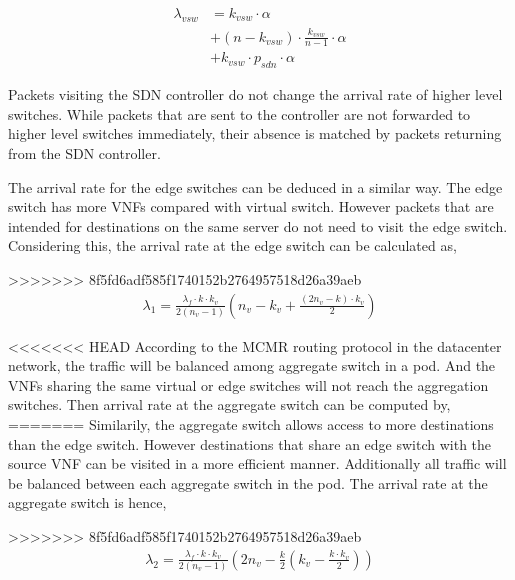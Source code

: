 \begin{equation}
\label{eq:arr_srv}
\begin{split}
\lambda_{vsw} &= k_{vsw} \cdot \alpha \\
			  &+ (n - k_{vsw}) \cdot \frac{k_{vsw}}{n - 1} \cdot \alpha \\
			  &+ k_{vsw} \cdot p_{sdn} \cdot \alpha
\end{split}
\end{equation}

Packets visiting the SDN controller do not change the arrival rate of higher level switches. While packets that are sent to the controller are not forwarded to higher level switches immediately, their absence is matched by packets returning from the SDN controller.

The arrival rate for the edge switches can be deduced in a similar way. The edge switch has more VNFs compared with virtual switch. However packets that are intended for destinations on the same server do not need to visit the edge switch. Considering this, the arrival rate at the edge switch can be calculated as,

>>>>>>> 8f5fd6adf585f1740152b2764957518d26a39aeb
\begin{equation}
\label{eq:arr_edge}
\begin{split}
\lambda _{1}=\frac { { \lambda  }_{ f }\cdot k\cdot k_{ v } }{ 2(n_v-1) } (n_v-k_{ v }+\frac { (2n_v-k)\cdot k_{ v } }{ 2 } )
\end{split}
\end{equation}

<<<<<<< HEAD
According to the MCMR routing protocol in the datacenter network, the traffic will be balanced among aggregate switch in a pod. And the VNFs sharing the same virtual or edge switches will not reach the aggregation switches. Then arrival rate at the aggregate switch can be computed by,
=======
Similarily, the aggregate switch allows access to more destinations than the edge switch. However destinations that share an edge switch with the source VNF can be visited in a more efficient manner. Additionally all traffic will be balanced between each aggregate switch in the pod. The arrival rate at the aggregate switch is hence,

>>>>>>> 8f5fd6adf585f1740152b2764957518d26a39aeb
\begin{equation}
\label{eq:arr_agg}
\begin{split}
\lambda _{ 2 }=\frac { { \lambda  }_{ f }\cdot k\cdot k_{ v } }{ 2({ n }_{ v }-1) } \left( 2{ n }_{ v }-\frac { k }{ 2 } \left( k_{ v }-\frac { k\cdot k_{ v } }{ 2 }  \right)  \right) 
\end{split}
\end{equation}

